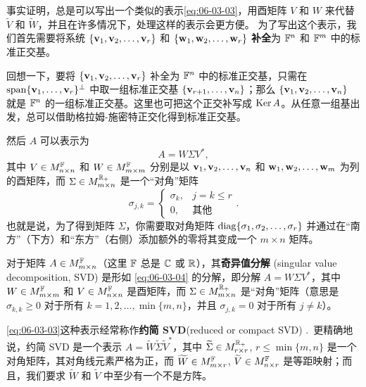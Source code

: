 事实证明，总是可以写出一个类似的表示\eqref{eq:06-03-03}，用酉矩阵 $V$ 和 $W$ 来代替 $\widetilde{V}$ 和 $\widetilde{W}$，并且在许多情况下，处理这样的表示会更方便。
为了写出这个表示，我们首先需要将系统 $\{\mathbf{v}_1, \mathbf{v}_2, \dots, \mathbf{v}_r\}$ 和 $\{\mathbf{w}_1, \mathbf{w}_2, \dots, \mathbf{w}_r\}$ \textbf{补全}为 $\mathbb{F}^n$ 和 $\mathbb{F}^m$ 中的标准正交基。

回想一下，要将 $\{\mathbf{v}_1, \mathbf{v}_2, \dots, \mathbf{v}_r\}$ 补全为 $\mathbb{F}^n$ 中的标准正交基，只需在 $\operatorname{span}\{\mathbf{v}_1,\dots,\mathbf{v}_r\}^{\perp}$ 中取一组标准正交基 $\{\mathbf{v}_{r+1}, \dots, \mathbf{v}_n\}$；那么 $\{\mathbf{v}_1, \mathbf{v}_2, \dots, \mathbf{v}_n\}$ 就是 $\mathbb{F}^n$ 的一组标准正交基。这里也可把这个正交补写成 $\operatorname{Ker} A$。从任意一组基出发，总可以借助格拉姆-施密特正交化得到标准正交基。

然后 $A$ 可以表示为
\begin{equation}\label{eq:06-03-04}
A = W \Sigma V^*,
\end{equation}
其中 $V \in M^{\mathbb{F}}_{n \times n}$ 和 $W \in M^{\mathbb{F}}_{m \times m}$ 分别是以 $\mathbf{v}_1, \mathbf{v}_2, \dots, \mathbf{v}_n$ 和 $\mathbf{w}_1, \mathbf{w}_2, \dots, \mathbf{w}_m$ 为列的酉矩阵，而 $\Sigma \in M^{\mathbb{R}_+}_{ m \times n}$ 是一个“对角”矩阵
\begin{equation}\label{eq:06-03-05}
\sigma_{j,k} = \begin{cases} \sigma_k, & j=k \leq r \\ 0, & \text{其他} \end{cases}.
\end{equation}
也就是说，为了得到矩阵 $\Sigma$，你需要取对角矩阵 $\operatorname{diag}\{\sigma_1, \sigma_2, \dots, \sigma_r\}$ 并通过在“南方”（下方）和“东方”（右侧）添加额外的零将其变成一个 $m \times n$ 矩阵。

\begin{definition}\label{stmt:06-03-09}
对于矩阵 $A \in M^{\mathbb{F}}_{m \times n}$（这里 $\mathbb{F}$ 总是 $\mathbb{C}$ 或 $\mathbb{R}$），其\textbf{奇异值分解} (singular value decomposition, SVD) 是形如 \eqref{eq:06-03-04} 的分解，即分解 $A = W \Sigma V^*$，其中 $W \in M^{\mathbb{F}}_{m \times m}$ 和 $V \in M^{\mathbb{F}}_{n \times n}$ 是酉矩阵，而 $\Sigma \in M^{\mathbb{R}_+}_{ m \times n}$ 是“对角”矩阵（意思是 $\sigma_{k,k} \geq 0$ 对于所有 $k = 1, 2, \dots, \min\{m, n\}$，并且 $\sigma_{j,k} = 0$ 对于所有 $j \neq k$）。
\end{definition}

\eqref{eq:06-03-03}这种表示经常称作\textbf{约简 SVD}(reduced or compact SVD) .~更精确地说，约简 SVD 是一个表示 $A = \widetilde{W} \widetilde{\Sigma} \widetilde{V}^*$，其中 $\widetilde{\Sigma} \in M^{\mathbb{R}_+}_{ r \times r}$, $r \leq \min\{m, n\}$ 是一个对角矩阵，其对角线元素严格为正，而 $\widetilde{W} \in M^{\mathbb{F}}_{m \times r}$, $\widetilde{V} \in M^{\mathbb{F}}_{n \times r}$ 是等距映射；而且，我们要求 $\widetilde{W}$ 和 $\widetilde{V}$ 中至少有一个不是方阵。

